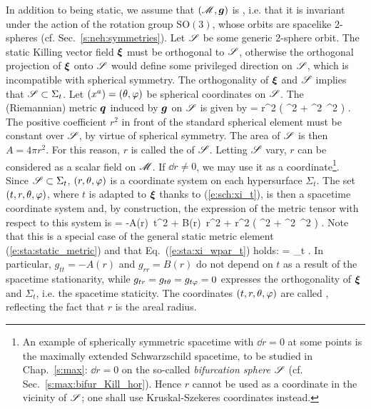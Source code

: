 In addition to being static, we assume that $(\mathscr{M},\bm{g})$ is ,
i.e. that it is invariant under the action of the rotation group $\mathrm{SO}(3)$,
whose orbits are spacelike 2-spheres (cf. Sec.~\ref{s:neh:symmetries}).
Let $\mathscr{S}$ be some generic 2-sphere orbit. The static Killing vector field $\bm{\xi}$
must be orthogonal to $\mathscr{S}$, otherwise the orthogonal projection of $\bm{\xi}$
onto $\mathscr{S}$ would define some privileged direction on $\mathscr{S}$, which is incompatible
with spherical symmetry. The orthogonality of $\bm{\xi}$ and $\mathscr{S}$ implies
that $\mathscr{S}\subset\Sigma_t$. Let $(x^a)=(\theta,\varphi)$ be spherical coordinates on
$\mathscr{S}$. The (Riemannian) metric $\bm{q}$ induced by $\bm{g}$ on $\mathscr{S}$ is given by
\be
     = r^2 \left( \dd\th^2 + \sin^2\th\, \dd\ph^2 \right) .
\ee
The positive coefficient $r^2$ in front of the standard spherical element must be
constant over $\mathscr{S}$, by virtue of spherical symmetry. The area of $\mathscr{S}$ is
then $A=4\pi r^2$. For this reason, $r$ is called the 
of $\mathscr{S}$. Letting $\mathscr{S}$ vary, $r$ can be considered as a scalar field on
$\mathscr{M}$. If $\dd r \not = 0$, we may use it as a coordinate\footnote{An example of spherically symmetric spacetime with $\dd r = 0$ at some points is the maximally extended Schwarzschild spacetime,
to be studied in Chap.~\ref{s:max}: $\dd r = 0$ on the so-called
\emph{bifurcation sphere} $\mathscr{S}$ (cf. Sec.~\ref{s:max:bifur_Kill_hor}). Hence $r$ cannot be used
as a coordinate in the vicinity of $\mathscr{S}$; one shall use Kruskal-Szekeres coordinates instead.}. Since $\mathscr{S}\subset \Sigma_t$,
$(r,\theta,\varphi)$ is a coordinate system on each hypersurface $\Sigma_t$.
The set $(t,r,\theta,\varphi)$,
where $t$ is adapted to $\bm{\xi}$ thanks to (\ref{e:sch:xi_t}), is then a
spacetime coordinate system and, by construction, the expression of the metric tensor
with respect to this system is
\be \label{e:sch:g_AB}
     = -A(r)\, \dd t^2 + B(r)\, \dd r^2 +
        r^2 \left( \dd\th^2 + \sin^2\th\, \dd\ph^2 \right) .
\ee
Note that this is a special case of the general static metric element
(\ref{e:sta:static_metric}) and that Eq.~(\ref{e:sta:xi_wpar_t}) holds:
\be \label{e:sch:xi_wpar_t}
    \w{\xi} = \wpar_t .
\ee
In particular, $g_{tt} = -A(r)$ and $g_{rr} = B(r)$ do not depend on $t$
as a result of the spacetime stationarity, while
$g_{tr} = g_{t\theta} = g_{t\varphi} = 0$ expresses the orthogonality of $\bm{\xi}$
and $\Sigma_t$, i.e. the spacetime staticity.
The coordinates $(t,r,\theta,\varphi)$ are called ,
reflecting the fact that $r$ is the areal radius.

